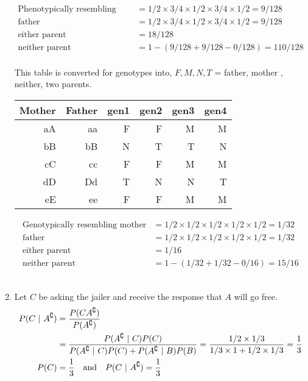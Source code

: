 \begin{enumerate}
	\begin{subequations}
		\begin{align}
			\text{Phenotypically resembling mother} &=  1/2 \times 3/4 \times 1/2 \times 3/4 \times 1/2  = 9/128\\
			\text{father} &=  1/2 \times 3/4 \times 1/2 \times 3/4 \times 1/2  = 9/128\\
			\text{either parent} &=  18/128 \\
			\text{neither parent} &=  1 - (9 / 128 + 9 / 128 - 0/128) = 110/128
		\end{align}
	\end{subequations}\\
	This table is converted for genotypes into, $ F, M, N, T $ = father, mother , neither, two parents.\\
	
	\begin{table}[H]
		\centering
		\begin{tabular}{@{}rr|rrrr@{}}
			\toprule
			Mother & Father & gen1 & gen2 & gen3 & gen4 \\ \midrule
			aA     & aa		& F	 & F 	  & M 	   & M   \\
			bB     & bB     & N	 & T 	  & T 	   & N    \\
			cC     & cc     & F	 & F 	  & M 	   & M    \\
			dD     & Dd     & T	 & N 	  & N 	   & T    \\
			eE     & ee     & F	 & F 	  & M 	   & M    \\ \bottomrule
		\end{tabular}
	\end{table}
	
	\begin{subequations}
		\begin{align}
			\text{Genotypically resembling mother} &=  1/2 \times 1/2 \times 1/2 \times 1/2 \times 1/2  = 1/32\\
			\text{father} &=   1/2 \times 1/2 \times 1/2 \times 1/2 \times 1/2  = 1/32\\
			\text{either parent} &=  1/16 \\
			\text{neither parent} &=  1 - (1/32 + 1/32 - 0/16) = 15/16
		\end{align}
	\end{subequations}\\
	
	\item Let $ C $ be asking the jailer and receive the response that $ A $ will go free. 
	\begin{subequations}
		\begin{align}
			P(C\ |\ A^\complement) &= \frac{P(C A^\complement)}{P(A^\complement)} \\
			& = \frac{P(A^\complement\ |\ C) P(C)}{P(A^\complement\ |\ C) P(C) +P(A^\complement\ |\ B) P(B)}  = \frac{1/2 \times 1/3}{1/3 \times 1 + 1/2 \times 1/3} = \frac{1}{3}\\
			P(C) &= \frac{1}{3} \quad \text{and} \quad P(C\ |\ A^\complement) = \frac{1}{3}
		\end{align}\\
	\end{subequations}
	

\end{enumerate}
